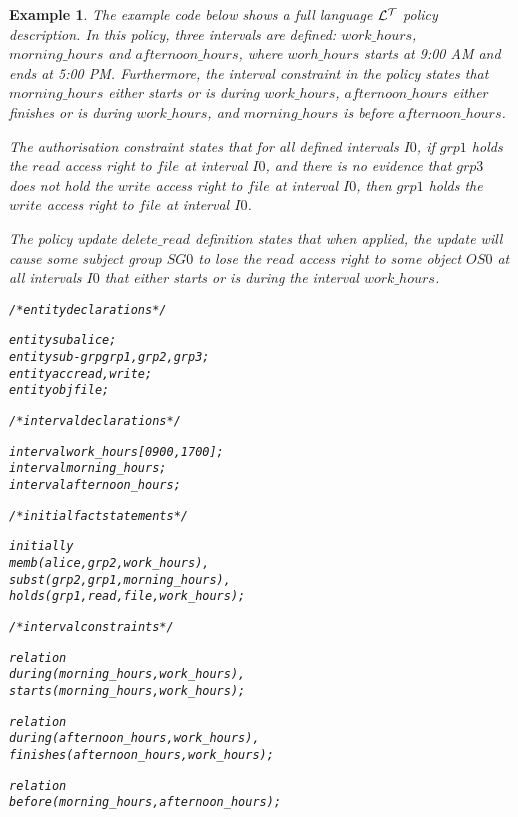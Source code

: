 \documentclass[11pt]{report}
\newtheorem{vexample}{Example}[chapter]
\newenvironment{vverbatim}
{
  \begin{alltt}
}
{
  \vspace{-\baselineskip}
  \end{alltt}
}
\begin{document}
        \begin{vexample}
          \label{ex-2}
          The example code below shows a full language ${\cal L^T}$ policy
          description. In this policy, three intervals are defined:
          $work\_hours$, $morning\_hours$ and $afternoon\_hours$, where
          $worh\_hours$ starts at 9:00 AM and ends at 5:00 PM. Furthermore,
          the interval constraint in the policy states that $morning\_hours$
          either {\em starts} or is {\em during} $work\_hours$,
          $afternoon\_hours$ either {\em finishes} or is {\em during}
          $work\_hours$, and $morning\_hours$ is {\em before}
          $afternoon\_hours$.

          The authorisation constraint states that for all defined intervals
          $I0$, if $grp1$ holds the $read$ access right to $file$ at interval
          $I0$, and there is no evidence that $grp3$ does not hold the $write$
          access right to $file$ at interval $I0$, then $grp1$ holds the
          $write$ access right to $file$ at interval $I0$.

          The policy update $delete\_read$ definition states that when applied,
          the update will cause some subject group $SG0$ to lose the $read$
          access right to some object $OS0$ at all intervals $I0$ that either
          {\em starts} or is {\em during} the interval $work\_hours$.

          \begin{vverbatim}
  /* entity declarations */

  entity sub alice;
  entity sub-grp grp1, grp2, grp3;
  entity acc read, write;
  entity obj file;

  /* interval declarations */

  interval work\_hours [0900, 1700];
  interval morning\_hours;
  interval afternoon\_hours;

  /* initial fact statements */

  initially
    memb(alice, grp2, work\_hours),
    subst(grp2, grp1, morning\_hours),
    holds(grp1, read, file, work\_hours);

  /* interval constraints */

  relation
    during(morning\_hours, work\_hours),
    starts(morning\_hours, work\_hours);

  relation
    during(afternoon\_hours, work\_hours),
    finishes(afternoon\_hours, work\_hours);

  relation
    before(morning\_hours, afternoon\_hours);


\end{vverbatim}
\end{vexample}
\end{document}
